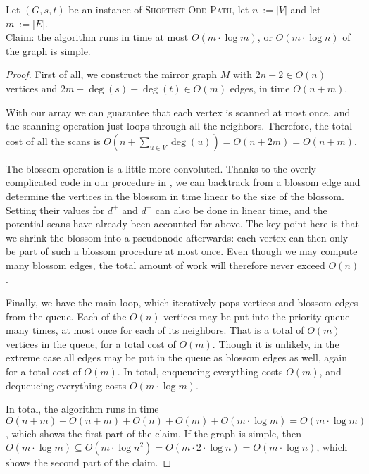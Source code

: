\begin{theorem}
    Let $(G,s,t)$ be an instance of \textsc{Shortest Odd Path}, let $n~:= |V|$ and let $m~:= |E|$. \\
    Claim: the algorithm runs in time at most $O(m \cdot \log m)$, or $O(m \cdot \log n)$ of the graph is simple.
    \begin{proof}  
        First of all, we construct the mirror graph $M$ with $2n-2 \in O(n)$ vertices and $2m - \deg(s) - \deg(t) \in O(m)$ edges, in time $O(n+m)$.
        
        With our  array we can guarantee that each vertex is scanned at most once, and the scanning operation just loops through all the neighbors. Therefore, the total cost of all the scans is $O(n + \sum_{u \in V} \deg(u)) = O(n + 2m) = O(n + m)$.
    
        The blossom operation is a little more convoluted. Thanks to the overly complicated code in our  procedure in , we can backtrack from a blossom edge and determine the vertices in the blossom in time linear to the size of the blossom. Setting their values for $d^+$ and $d^-$ can also be done in linear time, and the potential scans have already been accounted for above. The key point here is that we shrink the blossom into a pseudonode afterwards: each vertex can then only be part of such a blossom procedure at most once. Even though we may compute many blossom edges, the total amount of work will therefore never exceed $O(n)$.
    
        Finally, we have the main loop, which iteratively pops vertices and blossom edges from the queue. Each of the $O(n)$ vertices may be put into the priority queue many times, at most once for each of its neighbors. That is a total of $O(m)$ vertices in the queue, for a total cost of $O(m)$. Though it is unlikely, in the extreme case all edges may be put in the queue as blossom edges as well, again for a total cost of $O(m)$. In total, enqueueing everything costs $O(m)$, and dequeueing everything costs $O(m \cdot \log m)$.
    
        In total, the algorithm runs in time $O(n+m) + O(n+m) + O(n) + O(m) + O(m \cdot \log m) = O(m \cdot \log m)$, which shows the first part of the claim. If the graph is simple, then $O(m \cdot \log m) \subseteq O(m \cdot \log n^2) = O(m \cdot 2 \cdot \log n) = O(m \cdot \log n)$, which shows the second part of the claim.
    \end{proof}        
\end{theorem}

